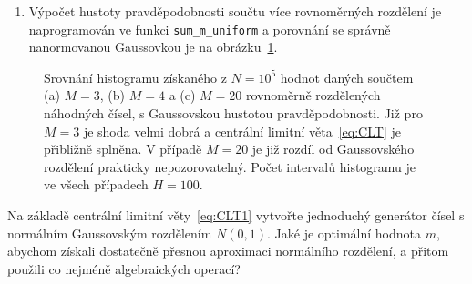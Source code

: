 \documentclass[a4paper,11pt,twoside]{article}
\def\code#1{\textnormal{\texttt{#1}}}
\theoremstyle{red}
\theoremstyle{green}
\begin{document}
\begin{solution}
\begin{enumerate}
            \item  
                Výpočet hustoty pravděpodobnosti součtu více rovnoměrných rozdělení je naprogramován ve funkci \code{sum_m_uniform} a porovnání se správně nanormovanou Gaussovkou je na obrázku~\ref{fig:Gaussian}. 
        \end{enumerate}

        \begin{figure}[!htb]
            \begin{subfigure}{0.33\linewidth}
                \centering{}
                \caption{}
            \end{subfigure}
            \begin{subfigure}{0.33\linewidth}
                \centering{}
                \caption{}
            \end{subfigure}
            \begin{subfigure}{0.33\linewidth}
                \centering{}
                \caption{}
            \end{subfigure}
            \caption{
                \protect\small
                Srovnání histogramu získaného z $N=10^{5}$ hodnot daných součtem (a) $M=3$, (b) $M=4$ a (c) $M=20$ rovnoměrně rozdělených náhodných čísel, s Gaussovskou hustotou pravděpodobnosti. 
                Již pro $M=3$ je shoda velmi dobrá a centrální limitní věta~\eqref{eq:CLT} je přibližně splněna.
                V případě $M=20$ je již rozdíl od Gaussovského rozdělení prakticky nepozorovatelný.
                Počet intervalů histogramu je ve všech případech $H=100$.
            }
            \label{fig:Gaussian}
        \end{figure}    
    \end{solution}

    \begin{solved}\label{task:NormalDistribution}
        Na základě centrální limitní věty~\eqref{eq:CLT1} vytvořte jednoduchý generátor čísel s normálním Gaussovským rozdělením $N(0,1)$.
        Jaké je optimální hodnota $m$, abychom získali dostatečně přesnou aproximaci normálního rozdělení, a přitom použili co nejméně algebraických operací?
    \end{solved}
\end{document}
